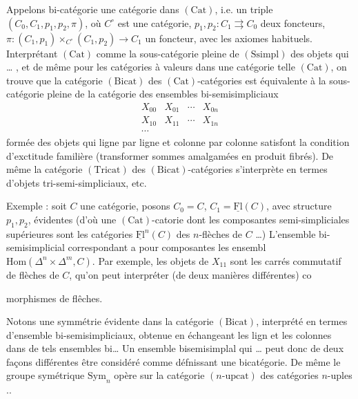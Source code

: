 \documentclass[11pt,a4paper]{article}
\begin{document}
Appelons bi-catégorie une catégorie dans $(\mathrm{Cat})$, i.e. un triple
$(C_{0}, C_{1}, p_{1}, p_{2}, \pi)$, où $C^{\circ}$ est une catégorie,
$p_{1}, p_{2} : C_{1} \rightrightarrows C_{0}$ deux foncteurs,
$\pi : (C_{1}, p_{1}) \times_{C^{\circ}} (C_{1}, p_{2}) \to C_{1}$ un
foncteur, avec les axiomes habituels.
Interprétant $(\mathrm{Cat})$ comme la sous-catégorie pleine de
$(\mathrm{Ssimpl})$ des objets qui … , et de même pour les catégories
à valeurs dans une catégorie telle $(\mathrm{Cat})$, on trouve que la
catégorie $(\mathrm{Bicat})$ des $(\mathrm{Cat})$-catégories est équivalente à
la sous-catégorie pleine de la catégorie des ensembles bi-semisimpliciaux
\[
\begin{array}{cccc}
X_{00} & X_{01} & \cdots & X_{0n} \\
X_{10} & X_{11} & \cdots & X_{1n} \\
\cdots & & & 
\end{array}
\]
formée des objets qui ligne par ligne et colonne par colonne satisfont la
condition d'exctitude familière (transformer sommes amalgamées en
produit fibrés). De même la catégorie $(\mathrm{Tricat})$ des
$(\mathrm{Bicat})$-catégories s'interprète en termes d'objets
tri-semi-simpliciaux, etc.

Exemple : soit $C$ une catégorie, posons $C_{0} = C$,
$C_{1} = \underline{\mathrm{Fl}}(C)$, avec structure $p_{1}, p_{2}$,
évidentes (d'où une $(\mathrm{Cat})$-catorie dont les composantes
semi-simpliciales supérieures sont les catégories
$\underline{\mathrm{Fl}}^{n}(C)$ des $n$-flèches de $C$ …) L'ensemble
bi-semisimplicial correspondant a pour composantes les ensembl
$\mathrm{Hom}(\Delta^{n} \times \Delta^{m}, C)$. Par exemple, les objets de
$X_{11}$ sont les carrés commutatif de flèches de $C$, qu'on peut
interpréter (de deux manières différentes) co

morphismes de flêches.

Notons une symmétrie évidente dans la catégorie $(\mathrm{Bicat})$,
interprété en termes d'ensemble bi-semisimpliciaux, obtenue en
échangeant les lign et les colonnes dans de tels ensembles bi…
Un ensemble bisemisimplal qui … peut donc de deux façons
différentes être considéré comme défnissant une bicatégorie. De même le
groupe symétrique $\mathrm{Sym}_{n}$ opère sur la catégorie
$(n\text{-upcat})$ des catégories $n$-uples ..
\end{document}

